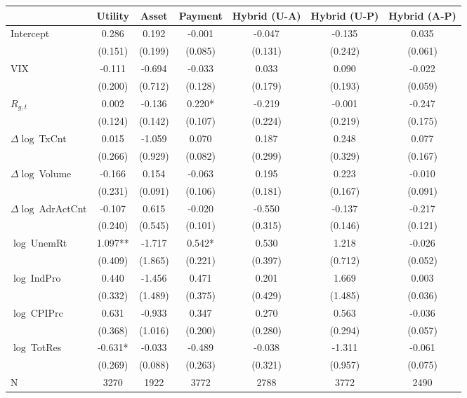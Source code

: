\begin{table}[ht]
\centering
\scriptsize
\setlength{\tabcolsep}{4pt}
\begin{tabular}{l *{6}{c}}
\toprule
 & Utility & Asset & Payment & Hybrid (U-A) & Hybrid (U-P) & Hybrid (A-P) \\
\midrule
Intercept & 0.286 & 0.192 & -0.001 & -0.047 & -0.135 & 0.035 \\
 & (0.151) & (0.199) & (0.085) & (0.131) & (0.242) & (0.061) \\
\addlinespace
VIX & -0.111 & -0.694 & -0.033 & 0.033 & 0.090 & -0.022 \\
 & (0.200) & (0.712) & (0.128) & (0.179) & (0.193) & (0.059) \\
\addlinespace
$R_{g,t}$ & 0.002 & -0.136 & 0.220* & -0.219 & -0.001 & -0.247 \\
 & (0.124) & (0.142) & (0.107) & (0.224) & (0.219) & (0.175) \\
\addlinespace
$\Delta\log\ $TxCnt & 0.015 & -1.059 & 0.070 & 0.187 & 0.248 & 0.077 \\
 & (0.266) & (0.929) & (0.082) & (0.299) & (0.329) & (0.167) \\
\addlinespace
$\Delta\log\ $Volume & -0.166 & 0.154 & -0.063 & 0.195 & 0.223 & -0.010 \\
 & (0.231) & (0.091) & (0.106) & (0.181) & (0.167) & (0.091) \\
\addlinespace
$\Delta\log\ $AdrActCnt & -0.107 & 0.615 & -0.020 & -0.550 & -0.137 & -0.217 \\
 & (0.240) & (0.545) & (0.101) & (0.315) & (0.146) & (0.121) \\
\addlinespace
$\log\ $UnemRt & 1.097** & -1.717 & 0.542* & 0.530 & 1.218 & -0.026 \\
 & (0.409) & (1.865) & (0.221) & (0.397) & (0.712) & (0.052) \\
\addlinespace
$\log\ $IndPro & 0.440 & -1.456 & 0.471 & 0.201 & 1.669 & 0.003 \\
 & (0.332) & (1.489) & (0.375) & (0.429) & (1.485) & (0.036) \\
\addlinespace
$\log\ $CPIPrc & 0.631 & -0.933 & 0.347 & 0.270 & 0.563 & -0.036 \\
 & (0.368) & (1.016) & (0.200) & (0.280) & (0.294) & (0.057) \\
\addlinespace
$\log\ $TotRes & -0.631* & -0.033 & -0.489 & -0.038 & -1.311 & -0.061 \\
 & (0.269) & (0.088) & (0.263) & (0.321) & (0.957) & (0.075) \\
\addlinespace
\midrule
N & 3270 & 1922 & 3772 & 2788 & 3772 & 2490 \\

\end{tabular}
\end{table}

